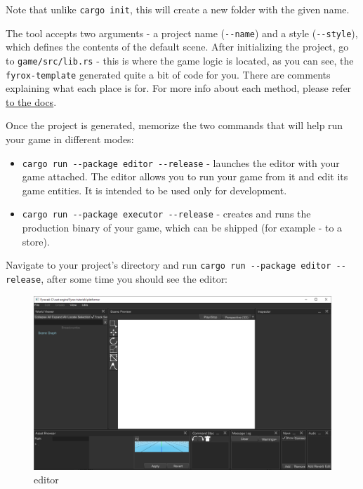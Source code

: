 \documentclass[
]{book}
\providecommand{\tightlist}{%
  \setlength{\itemsep}{0pt}\setlength{\parskip}{0pt}}
\theoremstyle{definition}
\theoremstyle{definition}
\theoremstyle{definition}
\theoremstyle{definition}
\theoremstyle{remark}
\begin{document}
Note that unlike \texttt{cargo\ init}, this will create a new folder with the given name.

The tool accepts two arguments - a project name (\texttt{-\/-name}) and a style (\texttt{-\/-style}), which defines the contents of the default scene. After initializing the project, go to \texttt{game/src/lib.rs} - this is where the game logic is located, as you can see, the \texttt{fyrox-template} generated quite a bit of code for you. There are comments explaining what each place is for. For more info about each method, please refer \href{https://docs.rs/fyrox/latest/fyrox/plugin/trait.Plugin.html}{to the docs}.

Once the project is generated, memorize the two commands that will help run your game in different modes:

\begin{itemize}
\tightlist
\item
  \texttt{cargo\ run\ -\/-package\ editor\ -\/-release} - launches the editor with your game attached. The editor allows you to run your game from it and edit its game entities. It is intended to be used only for development.
\item
  \texttt{cargo\ run\ -\/-package\ executor\ -\/-release} - creates and runs the production binary of your game, which can be shipped (for example - to a store).
\end{itemize}

Navigate to your project's directory and run \texttt{cargo\ run\ -\/-package\ editor\ -\/-release}, after some time you should see the editor:

\begin{figure}
\centering
\includegraphics{images/beginning_editor.png}
\caption{editor}
\end{figure}
\end{document}
